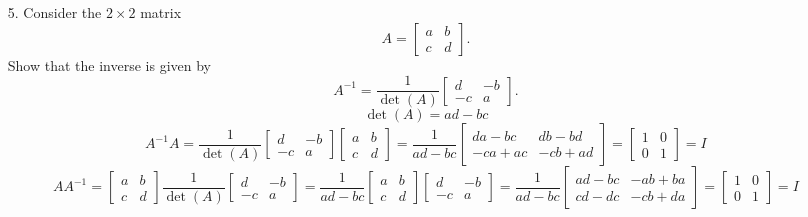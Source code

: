 \documentclass{article}
\begin{document}
\begin{enumerate}
  \item[5.]Consider the $2\times 2$ matrix 
  \[
  A=\left[\begin{array}{cc}a&b\\c&d\end{array}\right].
  \]
  Show that the inverse is given by 
  \[
  A^{-1}=\frac{1}{\det(A)}\left[\begin{array}{cc}d&-b\\-c&a\end{array}\right].
  \]
  \newline
  $$\det(A)=ad-bc$$
  $$A^{-1}A=\frac{1}{\det(A)}\left[\begin{array}{cc}d&-b\\-c&a\end{array}\right]
            \left[\begin{array}{cc}a&b\\c&d\end{array}\right]
    =\frac{1}{ad-bc}\left[\begin{array}{cc}da-bc&db-bd\\-ca+ac&-cb+ad\end{array}
     \right]
    =\left[\begin{array}{cc}1&0\\0&1\end{array}\right]=I$$
  $$AA^{-1}=\left[\begin{array}{cc}a&b\\c&d\end{array}\right]
            \frac{1}{\det(A)}\left[\begin{array}{cc}d&-b\\-c&a\end{array}\right]
    =\frac{1}{ad-bc}\left[\begin{array}{cc}a&b\\c&d\end{array}\right]
     \left[\begin{array}{cc}d&-b\\-c&a\end{array}\right]
    =\frac{1}{ad-bc}\left[\begin{array}{cc}ad-bc&-ab+ba\\cd-dc&-cb+da\end{array}
     \right]
    =\left[\begin{array}{cc}1&0\\0&1\end{array}\right]=I$$
  \end{enumerate}
\end{document}
